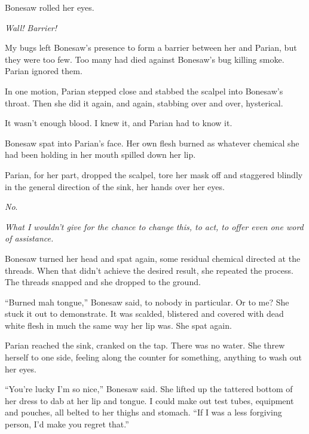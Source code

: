 Bonesaw rolled her eyes.



\emph{Wall!  }\emph{Barrier!}



My bugs left Bonesaw's presence to form a barrier between her and Parian, but they were too few.  Too many had died against Bonesaw's bug killing smoke.  Parian ignored them.



In one motion, Parian stepped close and stabbed the scalpel into Bonesaw's throat.  Then she did it again, and again, stabbing over and over, hysterical.



It wasn't enough blood.  I knew it, and Parian had to know it.



Bonesaw spat into Parian's face.  Her own flesh burned as whatever chemical she had been holding in her mouth spilled down her lip.



Parian, for her part, dropped the scalpel, tore her mask off and staggered blindly in the general direction of the sink, her hands over her eyes.



\emph{No}.



\emph{What I wouldn't give for the chance to change this, to act, to offer even one word of assistance.}



Bonesaw turned her head and spat again, some residual chemical directed at the threads. When that didn't achieve the desired result, she repeated the process.  The threads snapped and she dropped to the ground.



``Burned mah tongue,'' Bonesaw said, to nobody in particular.  Or to me?  She stuck it out to demonstrate.  It was scalded, blistered and covered with dead white flesh in much the same way her lip was.  She spat again.



Parian reached the sink, cranked on the tap.  There was no water.  She threw herself to one side, feeling along the counter for something, anything to wash out her eyes.



``You're lucky I'm so nice,'' Bonesaw said.  She lifted up the tattered bottom of her dress to dab at her lip and tongue.  I could make out test tubes, equipment and pouches, all belted to her thighs and stomach.  ``If I was a less forgiving person, I'd make you regret that.''



